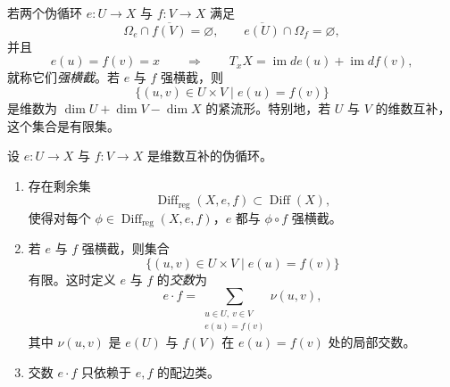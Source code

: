 若两个伪循环 $e:U\to X$ 与 $f:V\to X$ 满足
\[
  \Omega_e\cap\overline{f(V)}=\varnothing,
  \qquad
  \overline{e(U)}\cap\Omega_f=\varnothing,
\]
并且
\[
  e(u)=f(v)=x
  \qquad\Longrightarrow\qquad
  T_xX=\operatorname{im}de(u)+\operatorname{im}df(v),
\]
就称它们\emph{强横截}。若 $e$ 与 $f$ 强横截，则
\[
  \{(u,v)\in U\times V\mid e(u)=f(v)\}
\]
是维数为 $\dim U+\dim V-\dim X$ 的紧流形。特别地，若 $U$ 与 $V$ 的维数互补，
这个集合是有限集。

\begin{lemma}\label{lem:6-5-5}
设 $e:U\to X$ 与 $f:V\to X$ 是维数互补的伪循环。
\begin{enumerate}[label=(\roman*),leftmargin=3em]
\item 存在剩余集
\[
  \operatorname{Diff}_{\mathrm{reg}}(X,e,f)
  \subset\operatorname{Diff}(X),
\]
使得对每个 $\phi\in\operatorname{Diff}_{\mathrm{reg}}(X,e,f)$，$e$ 都与
$\phi\circ f$ 强横截。
\item 若 $e$ 与 $f$ 强横截，则集合
\[
  \{(u,v)\in U\times V\mid e(u)=f(v)\}
\]
有限。这时定义 $e$ 与 $f$ 的\emph{交数}为
\[
  e\cdot f
  =\sum_{\substack{u\in U,\ v\in V\\e(u)=f(v)}}\nu(u,v),
\]
其中 $\nu(u,v)$ 是 $e(U)$ 与 $f(V)$ 在 $e(u)=f(v)$ 处的局部交数。
\item 交数 $e\cdot f$ 只依赖于 $e,f$ 的配边类。
\end{enumerate}
\end{lemma}

